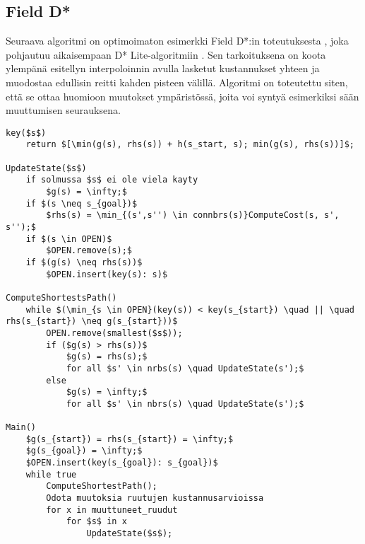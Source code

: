 \documentclass[finnish]{tktltiki2}
\theoremstyle{definition}
\theoremstyle{remark}
\begin{document}
\subsection{Field D*}
Seuraava algoritmi on optimoimaton esimerkki Field D*:in toteutuksesta \cite{ferguson2007field}, joka pohjautuu aikaisempaan D* Lite-algoritmiin \cite{koenig2002d}. Sen tarkoituksena on koota ylempänä esitellyn interpoloinnin avulla lasketut kustannukset yhteen ja muodostaa edullisin reitti kahden pisteen välillä. Algoritmi on toteutettu siten, että se ottaa huomioon muutokset ympäristössä, joita voi syntyä esimerkiksi sään muuttumisen seurauksena.

\lstset{basicstyle=\tiny, tabsize=4}
\begin{lstlisting}[mathescape=true]
key($s$)
	return $[\min(g(s), rhs(s)) + h(s_start, s); min(g(s), rhs(s))]$;

UpdateState($s$)
	if solmussa $s$ ei ole viela kayty
		$g(s) = \infty;$
	if $(s \neq s_{goal})$
		$rhs(s) = \min_{(s',s'') \in connbrs(s)}ComputeCost(s, s', s'');$
	if $(s \in OPEN)$
		$OPEN.remove(s);$
	if $(g(s) \neq rhs(s))$
		$OPEN.insert(key(s): s)$

ComputeShortestsPath()
	while $(\min_{s \in OPEN}(key(s)) < key(s_{start}) \quad || \quad rhs(s_{start}) \neq g(s_{start}))$
		OPEN.remove(smallest($s$));
		if ($g(s) > rhs(s))$
			$g(s) = rhs(s);$
			for all $s' \in nrbs(s) \quad UpdateState(s');$
		else
			$g(s) = \infty;$
			for all $s' \in nbrs(s) \quad UpdateState(s');$

Main()
	$g(s_{start}) = rhs(s_{start}) = \infty;$
	$g(s_{goal}) = \infty;$
	$OPEN.insert(key(s_{goal}): s_{goal})$
	while true
		ComputeShortestPath();
		Odota muutoksia ruutujen kustannusarvioissa
		for x in muuttuneet_ruudut
			for $s$ in x
				UpdateState($s$);


\end{lstlisting}



%
%
% 
%







% 
\end{document}
